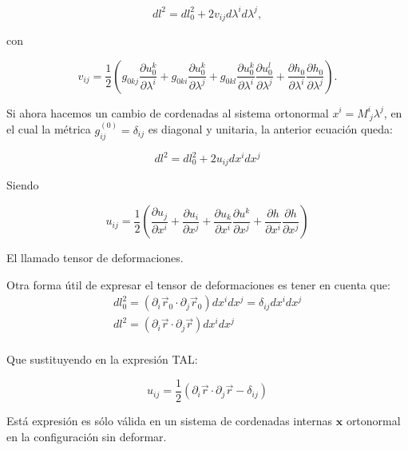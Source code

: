 \begin{equation*}
dl^2=dl^2_0+2v_{ij}d\lambda^id\lambda^j,
\end{equation*}

con

\begin{equation*}
v_{ij}=\frac{1}{2}\left(
 g_{0kj}\frac{\partial u^k_0}{\partial \lambda^i}+
  g_{0ki}\frac{\partial u^k_0}{\partial \lambda^j}+
g_{0kl}\frac{\partial u^k_0}{\partial\lambda^i}
\frac{\partial u^l_0}{\partial \lambda^j}+
\frac{\partial h_0}{\partial \lambda^i}\frac{\partial h_0}{\partial \lambda^j}\right).
\end{equation*}

Si ahora hacemos un cambio de cordenadas al sistema ortonormal $x^i=M^i_{\
  j}\lambda^j$, en el cual la métrica $g^{(0)}_{ij}=\delta_{ij}$ es diagonal y
unitaria, la anterior ecuación queda: 

\begin{equation}\label{ecuacion_deformacion}
dl^2=dl^2_0+2u_{ij}dx^idx^j
\end{equation}

Siendo

\begin{equation}\label{tensor_deformacion}
u_{ij}=\frac{1}{2}\left(
\frac{\partial u_j}{\partial x^i}+
\frac{\partial u_i}{\partial x^j}+
\frac{\partial u_k}{\partial x^i}
\frac{\partial u^k}{\partial x^j}+
\frac{\partial h}{\partial x^i}
\frac{\partial h}{\partial x^j}\right)
\end{equation} 

El llamado tensor de deformaciones.

Otra forma útil de expresar el tensor de deformaciones es tener en cuenta que:
\begin{align}
dl^2_0=(\partial_i \vec{r}_0\cdot \partial_j \vec{r}_0)dx^idx^j=\delta_{ij}dx^idx^j\\
dl^2=(\partial_i \vec{r}\cdot \partial_j \vec{r})dx^idx^j\\
\end{align}

Que sustituyendo en la expresión TAL:

\begin{equation}
u_{ij}=\frac{1}{2}\left(\partial_i \vec{r}\cdot \partial_j \vec{r} - \delta_{ij}\right)
\end{equation}

Está expresión es sólo válida en un sistema de cordenadas internas
$\mathbf{x}$ ortonormal en la configuración sin deformar.

